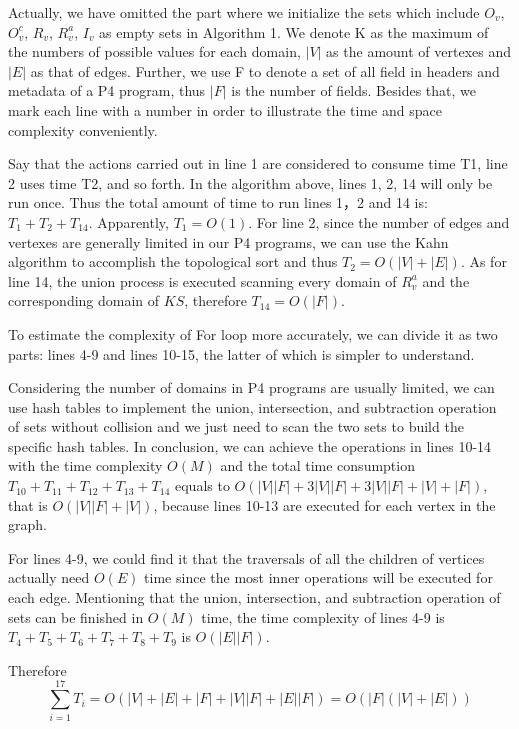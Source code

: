 Actually, we have omitted the part where we initialize the sets which include $O_{v}$,  $O^{c}_{v}$, $R_{v}$, $R^{a}_{v}$, $I_{v}$ as empty sets in Algorithm 1. We denote K as the maximum of the numbers of possible values for each domain, $|V|$ as the amount of vertexes and $|E|$ as that of edges. Further, we use F to denote a set of all field in headers and metadata of a P4 program, thus $|F|$ is the number of fields. Besides that, we mark each line with a number in order to illustrate the time and space complexity conveniently.

Say that the actions carried out in line 1 are considered to consume time T1, line 2 uses time T2, and so forth.
In the algorithm above, lines 1, 2, 14 will only be run once. Thus the total amount of time to run lines 1，2 and 14 is:
$ T_{1}+T_{2}+T_{14}.$ Apparently, $ T_{1} = O(1)$. For line 2, since the number of edges and vertexes are generally limited in our P4 programs, we can use the Kahn algorithm to accomplish the topological sort and thus $ T_{2} = O(|V| + |E|)$. As for line 14, the union process is executed scanning every domain of $R^{a}_{v}$ and the corresponding domain of $KS$, therefore $ T_{14} = O(|F|)$.

To estimate the complexity of For loop more accurately, we can divide it as two parts: lines 4-9 and lines 10-15, the latter of which is simpler to understand.

Considering the number of domains in P4 programs are usually limited, we can use hash tables to implement the union, intersection, and subtraction operation of sets without collision and we just need to scan the two sets to build the specific hash tables. In conclusion, we can achieve the operations in lines 10-14 with the time complexity $O(M)$ and the total time consumption $T_{10} + T_{11} + T_{12} + T_{13} + T_{14}$ equals to $O( |V||F| + 3|V||F| + 3|V||F| + |V|+|F|)$, that is $O(|V||F| + |V|)$, because lines 10-13 are executed for each vertex in the graph.


For lines 4-9, we could find it that the traversals of all the children of vertices actually need $O(E)$ time since the most inner operations will be executed for each edge. Mentioning that the union, intersection, and subtraction operation of sets can be finished in $O(M)$ time, the time complexity of lines 4-9 is $T_{4} + T_{5} + T_{6} + T_{7} + T_{8} + T_{9}$ is $O(|E||F|)$.

Therefore 
\begin{displaymath}
\sum_{i=1}^{17}T_{i}= O(|V|+|E|+|F|+|V||F|+|E||F|) =O(|F|(|V|+|E|))
\end{displaymath}


